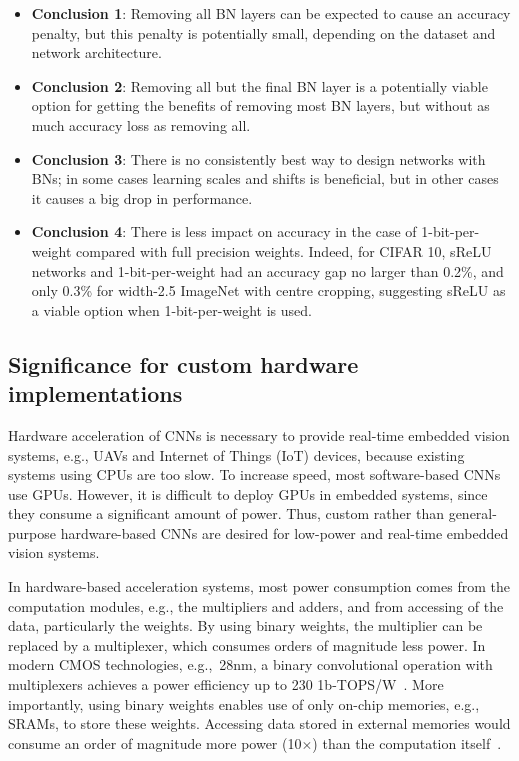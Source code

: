 \documentclass[conference]{IEEEtran}
\begin{document}
\begin{itemize}
    \item {\bf Conclusion 1}: Removing all BN layers can be expected to cause an accuracy penalty, but this penalty is potentially small, depending on the dataset and network architecture.
    \item {\bf Conclusion 2}: Removing all but the final BN layer is a potentially viable option for getting the benefits of removing most BN layers, but without as much accuracy loss as removing all.
    \item {\bf Conclusion 3}: There is no consistently best way to design networks with BNs; in some cases learning scales and shifts is beneficial, but in other cases it causes a big drop in performance.
     \item {\bf Conclusion 4}: There is less impact on accuracy in the case of 1-bit-per-weight compared with full precision weights. Indeed, for CIFAR 10, sReLU networks and 1-bit-per-weight had an accuracy gap no larger than 0.2\%, and only 0.3\% for width-2.5 ImageNet with centre cropping, suggesting sReLU as a viable option when 1-bit-per-weight is used.
\end{itemize}

\subsection{Significance for custom hardware implementations}

Hardware acceleration of CNNs is necessary to provide real-time embedded vision systems, e.g., UAVs and Internet of Things (IoT) devices, because existing systems using CPUs are too slow. To increase speed, most software-based CNNs use GPUs. However, it is difficult to deploy GPUs in embedded systems, since they consume a significant amount of power. Thus, custom rather than general-purpose hardware-based CNNs are desired for low-power and real-time embedded vision systems. 
 
In hardware-based acceleration systems, most power consumption comes from the computation modules, e.g., the multipliers and adders, and from  accessing of the data, particularly the weights. By using binary weights, the multiplier can be replaced by a multiplexer, which consumes orders of magnitude less power. In modern CMOS technologies, e.g.,~28nm, a binary convolutional operation with multiplexers achieves a power efficiency up to 230 1b-TOPS/W~\cite{Moons.18}. More importantly, using binary weights enables use of only on-chip memories, e.g., SRAMs, to store these weights. Accessing data stored in external memories would consume an order of magnitude more power (10$\times$) than the computation itself~\cite{Chen.16}. 
 
\end{document}
